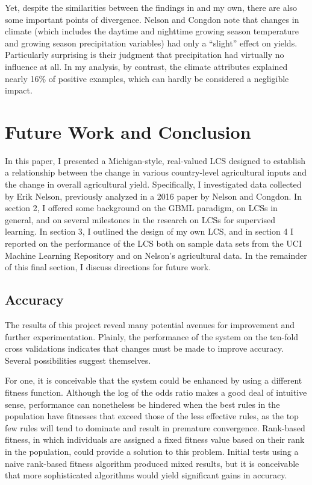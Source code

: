 \documentclass[12pt]{article}
\begin{document}
Yet, despite the similarities between the findings in \cite{nelson_measuring_2016} and my own, there are also some important points of divergence. Nelson and Congdon note that changes in climate (which includes the daytime and nighttime growing season temperature and growing season precipitation variables) had only a ``slight'' effect on yields. Particularly surprising is their judgment that precipitation had virtually no influence at all. In my analysis, by contrast, the climate attributes explained nearly 16\% of positive examples, which can hardly be considered a negligible impact. 

\section{Future Work and Conclusion}

In this paper, I presented a Michigan-style, real-valued LCS designed to establish a relationship between the change in various country-level agricultural inputs and the change in overall agricultural yield. Specifically, I investigated data collected by Erik Nelson, previously analyzed in a 2016 paper by Nelson and Congdon. In section 2, I offered some background on the GBML paradigm, on LCSs in general, and on several milestones in the research on LCSs for supervised learning. In section 3, I outlined the design of my own LCS, and in section 4 I reported on the performance of the LCS both on sample data sets from the UCI Machine Learning Repository and on Nelson's agricultural data. In the remainder of this final section, I discuss directions for future work.

\subsection{Accuracy}
The results of this project reveal many potential avenues for improvement and further experimentation. Plainly, the performance of the system on the ten-fold cross validations indicates that changes must be made to improve accuracy. Several possibilities suggest themselves. 

For one, it is conceivable that the system could be enhanced by using a different fitness function. Although the log of the odds ratio makes a good deal of intuitive sense, performance can nonetheless be hindered when the best rules in the population have fitnesses that exceed those of the less effective rules, as the top few rules will tend to dominate and result in premature convergence. Rank-based fitness, in which individuals are assigned a fixed fitness value based on their rank in the population, could provide a solution to this problem. Initial tests using a naive rank-based fitness algorithm produced mixed results, but it is conceivable that more sophisticated algorithms would yield significant gains in accuracy.
\end{document}
